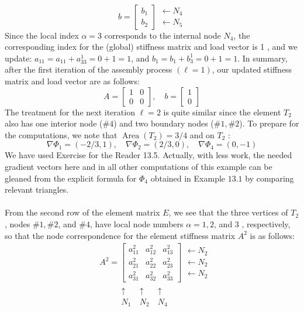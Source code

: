 \documentclass[../main.tex]{subfiles}
\begin{document}
\\
$$
b=\left[\begin{array}{l}
b_{1} \\
b_{2}
\end{array}\right]\begin{array}{ll}
\leftarrow N_{4}\\
\leftarrow N_{5}
\end{array}
$$
Since the local index $\alpha=3$ corresponds to the internal node $N_{4}$, the corresponding index for the (global) stiffness matrix and load vector is 1 , and we update: $a_{11}=a_{11}+a_{33}^{1}=0+1=1$, and $b_{1}=b_{1}+b_{3}^{1}=0+1=1$. In summary, after the first iteration of the assembly process $(\ell=1)$, our updated stiffness matrix and load vector are as follows:
$$
A=\left[\begin{array}{ll}
1 & 0 \\
0 & 0
\end{array}\right], \quad b=\left[\begin{array}{l}
1 \\
0
\end{array}\right]
$$
The treatment for the next iteration $\ell=2$ is quite similar since the element $T_{2}$ also has one interior node ($\#4$) and two boundary nodes ($\#1, \#2$). To prepare for the computations, we note that $\operatorname{Area}\left(T_{2}\right)=3 / 4$ and on $T_{2}$ :
$$
\nabla \Phi_{1}=(-2 / 3,1), \quad \nabla \Phi_{2}=(2 / 3,0), \quad \nabla \Phi_{4}=(0,-1)
$$
We have used Exercise for the Reader 13.5. Actually, with less work, the needed gradient vectors here and in all other computations of this example can be gleaned from the explicit formula for $\Phi_{4}$ obtained in Example $13.1$ by comparing relevant triangles.
\\
\\
From the second row of the element matrix $E$, we see that the three vertices of $T_{2}$, nodes $\#1, \#2$, and $\#4$, have local node numbers $\alpha=1,2$, and 3 , respectively, so that the node correspondence for the element stiffness matrix $A^{2}$ is as follows:
\\
$$
\begin{aligned}
&A^{2}=\left[\begin{array}{lll}
a_{11}^{2} & a_{12}^{2} & a_{13}^{2} \\
a_{21}^{2} & a_{22}^{2} & a_{23}^{2} \\
a_{31}^{2} & a_{32}^{2} & a_{33}^{2}
\end{array}\right] \begin{array}{lll}
\leftarrow N_{2}\\
\leftarrow N_{2}\\
\leftarrow N_{2}
\end{array}
\\
&\begin{array}{ccccc}
~&~&~\uparrow &~\uparrow &~\uparrow\\
~&~&~N_{1}&~N_{2}&~N_{4}
\end{array}
\end{aligned}
$$
\end{document}
